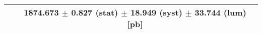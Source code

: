 \begin{tabular}{lc}
\hline
                               & 1874.673 $\pm$ 0.827 (stat) $\pm$ 18.949 (syst) $\pm$ 33.744 (lum) [pb]  \\
\hline
\end{tabular}
